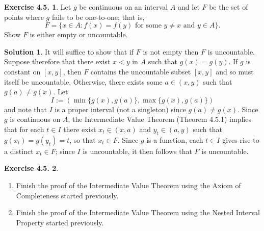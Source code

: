 \documentclass[12pt]{article}
\theoremstyle{definition}
\theoremstyle{exercise}
\newtheorem{exercise}{Exercise 4.5.}
\theoremstyle{solution}
\newtheorem*{solution}{Solution}
\begin{document}
\begin{exercise}
\label{ex:4}
    Let \( g \) be continuous on an interval \( A \) and let \( F \) be the set of points where \( g \) fails to be one-to-one; that is,
    \[
        F = \{ x \in A : f(x) = f(y) \text{ for some } y \neq x \text{ and } y \in A \}.
    \]
    Show \( F \) is either empty or uncountable.
\end{exercise}

\begin{solution}
    It will suffice to show that if \( F \) is not empty then \( F \) is uncountable. Suppose therefore that there exist \( x < y \) in \( A \) such that \( g(x) = g(y) \). If \( g \) is constant on \( [x, y] \), then \( F \) contains the uncountable subset \( [x, y] \) and so must itself be uncountable. Otherwise, there exists some \( a \in (x, y) \) such that \( g(a) \neq g(x) \). Let
    \[
        I := \left( \min \{ g(x), g(a) \}, \max \{ g(x), g(a) \} \right)
    \]
    and note that \( I \) is a proper interval (not a singleton) since \( g(a) \neq g(x) \). Since \( g \) is continuous on \( A \), the Intermediate Value Theorem (Theorem 4.5.1) implies that for each \( t \in I \) there exist \( x_t \in (x, a) \) and \( y_t \in (a, y) \) such that \( g(x_t) = g(y_t) = t \), so that \( x_t \in F \). Since \( g \) is a function, each \( t \in I \) gives rise to a distinct \( x_t \in F \); since \( I \) is uncountable, it then follows that \( F \) is uncountable.
\end{solution}

\begin{exercise}
\label{ex:5}
    \begin{enumerate}
        \item Finish the proof of the Intermediate Value Theorem using the Axiom of Completeness started previously.

        \item Finish the proof of the Intermediate Value Theorem using the Nested Interval Property started previously.
    \end{enumerate}
\end{exercise}
\end{document}
